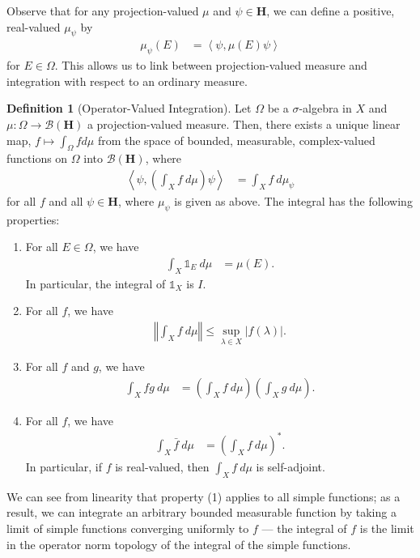 \documentclass[12pt]{extarticle}
\newcommand{\iprod}[2]{\left\langle #1,#2\right\rangle}
\newcommand{\norm}[1]{\left\Vert #1\right\Vert}
\theoremstyle{plain}
\theoremstyle{definition}
\newtheorem*{definition}{Definition}
\theoremstyle{remark}
\renewcommand{\newline}{\hfill\break}
\begin{document}
  Observe that for any projection-valued $\mu$ and $\psi\in \mathbf{H}$, we can define a positive, real-valued $\mu_{\psi}$ by
  \begin{align*}
    \mu_{\psi}(E) &= \iprod{\psi}{\mu(E)\psi}
  \end{align*}
  for $E\in \Omega$. This allows us to link between projection-valued measure and integration with respect to an ordinary measure.
  \begin{definition}[Operator-Valued Integration]
    Let $\Omega$ be a $\sigma$-algebra in $X$ and $\mu: \Omega \rightarrow \mathcal{B}\left(\mathbf{H}\right)$ a projection-valued measure. Then, there exists a unique linear map, $f \mapsto \int_{\Omega}fd\mu$ from the space of bounded, measurable, complex-valued functions on $\Omega$ into $\mathcal{B}(\mathbf{H})$, where
    \begin{align*}
      \iprod{\psi}{\left(\int_{X}f\:d\mu\right)\psi} &= \int_{X}f \:d\mu_{\psi}
    \end{align*}
    for all $f$ and all $\psi \in \mathbf{H}$, where $\mu_{\psi}$ is given as above. The integral has the following properties:
    \begin{enumerate}[(1)]
      \item For all $E\in \Omega$, we have
        \begin{align*}
          \int_{X}^{} \mathbb{1}_{E} \:d\mu &= \mu(E).
        \end{align*}
        In particular, the integral of $\mathbb{1}_{X}$ is $I$.
      \item For all $f$, we have
        \begin{align*}
          \norm{\int_{X}f\:d\mu} \leq \sup_{\lambda \in X}|f(\lambda)|.
        \end{align*}
      \item For all $f$ and $g$, we have
        \begin{align*}
          \int_{X}fg\:d\mu &= \left(\int_{X}f\:d\mu\right) \left(\int_{X}^{} g \:d\mu\right).
        \end{align*}
      \item For all $f$, we have
        \begin{align*}
          \int_{X}^{} \bar{f} \:d\mu &= \left(\int_{X}^{} f \:d\mu\right)^{\ast}.
        \end{align*}
        In particular, if $f$ is real-valued, then $\int_{X}f\:d\mu$ is self-adjoint.
    \end{enumerate}
  \end{definition}
  We can see from linearity that property (1) applies to all simple functions; as a result, we can integrate an arbitrary bounded measurable function by taking a limit of simple functions converging uniformly to $f$ --- the integral of $f$ is the limit in the operator norm topology of the integral of the simple functions.\newline
\end{document}
